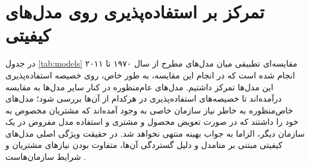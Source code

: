 \section{تمرکز بر استفاده‌پذیری روی مدل‌های کیفیتی}
در جدول
\ref{tab:models}
مقایسه‌ای تطبیقی میان مدل‌های مطرح از سال ۱۹۷۰ تا ۲۰۱۱ انجام شده است که در انجام این مقایسه، به طور خاص، روی خصیصه استفاده‌پذیری این مدل‌ها تمرکز داشتیم. مدل‌های عام‌منظوره در کنار سایر مدل‌ها به مقایسه درآمده‌اند تا خصیصه‌های استفاده‌پذیری در هرکدام از آن‌ها بررسی شود؛ مدل‌های خاص‌منظوره به خاطر نیاز سازمان خاصی به وجود آمده‌اند که مشتریان مخصوص به خود را داشتند که در صورت تعویض محصول و مشتری و استفاده مدل مفروض در یک سازمان دیگر، الزاما به جواب بهینه منتهی نخواهد شد. در حقیقت ویژگی اصلی مدل‌های کیفیتی مبتنی بر متامدل و دلیل گستردگی آن‌ها، متفاوت بودن نیازهای مشتریان و شرایط سازمان‌هاست
\cite{sommerville_software_2016}.
\tiny
